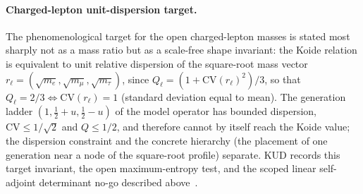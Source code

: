 \documentclass[11pt,a4paper]{article}
\theoremstyle{definition}
\begin{document}
    \paragraph{Charged-lepton unit-dispersion target.}
    The phenomenological target for the open charged-lepton masses is stated most sharply not as a mass ratio but
    as a scale-free shape invariant: the Koide relation is equivalent to unit relative dispersion of the
    square-root mass vector $r_\ell = (\sqrt{m_e}, \sqrt{m_\mu}, \sqrt{m_\tau})$, since
    $Q_\ell = (1 + \mathrm{CV}(r_\ell)^2)/3$, so that $Q_\ell = 2/3 \iff \mathrm{CV}(r_\ell) = 1$
    (standard deviation equal to mean).
    The generation ladder $(1, \tfrac12 + u, \tfrac12 - u)$ of the model operator has bounded dispersion,
    $\mathrm{CV} \le 1/\sqrt2$ and $Q \le 1/2$, and therefore cannot by itself reach the Koide value; the dispersion
    constraint and the concrete hierarchy (the placement of one generation near a node of the square-root profile)
    separate.
    KUD records this target invariant, the open maximum-entropy test, and the scoped linear self-adjoint
    determinant no-go described above~\cite{Beau2026kud}.
\end{document}
